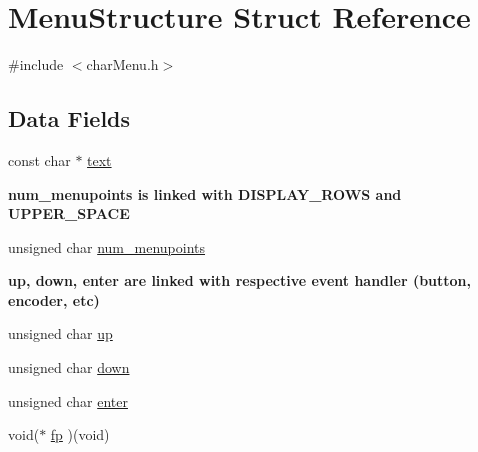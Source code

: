\hypertarget{struct_menu_structure}{}\section{Menu\+Structure Struct Reference}
\label{struct_menu_structure}


{\ttfamily \#include $<$char\+Menu.\+h$>$}

\subsection*{Data Fields}
\textbf{ }\par
\begin{DoxyCompactItemize}
\item 
const char $\ast$ \mbox{\hyperlink{struct_menu_structure_a0726774a008bbbd0740ce033cd5b7c7a}{text}}
\end{DoxyCompactItemize}

\begin{Indent}\textbf{ num\+\_\+menupoints is linked with D\+I\+S\+P\+L\+A\+Y\+\_\+\+R\+O\+WS and U\+P\+P\+E\+R\+\_\+\+S\+P\+A\+CE}\par
\begin{DoxyCompactItemize}
\item 
unsigned char \mbox{\hyperlink{struct_menu_structure_a03bb2b81933329456adb5a4dd4e6ee68}{num\+\_\+menupoints}}
\end{DoxyCompactItemize}
\end{Indent}
\begin{Indent}\textbf{ up, down, enter are linked with respective event handler (button, encoder, etc)}\par
\begin{DoxyCompactItemize}
\item 
unsigned char \mbox{\hyperlink{struct_menu_structure_ac983323a9dfb0e5b141bd9f06c7f2d94}{up}}
\item 
unsigned char \mbox{\hyperlink{struct_menu_structure_a91c52cae9cca9734fd5b116d9624db08}{down}}
\item 
unsigned char \mbox{\hyperlink{struct_menu_structure_a18371001fe83f38e112c2cdb237fe821}{enter}}
\end{DoxyCompactItemize}
\end{Indent}
\textbf{ }\par
\begin{DoxyCompactItemize}
\item 
void($\ast$ \mbox{\hyperlink{struct_menu_structure_a9fa7771424c33bfa30bf05f7fdcc4a1a}{fp}} )(void)
\end{DoxyCompactItemize}



